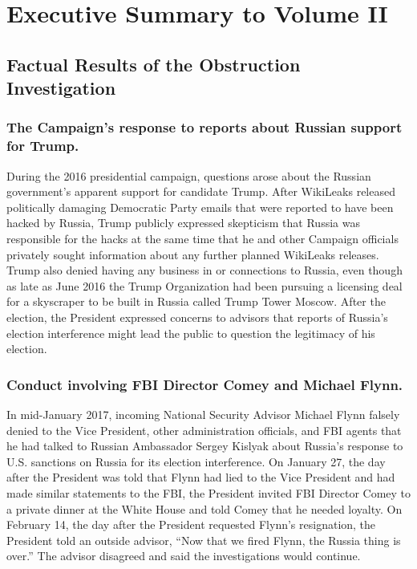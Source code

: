 \section*{Executive Summary to Volume II}
\label{sec:executive-2}

\subsection*{Factual Results of the Obstruction Investigation}

\subsubsection*{The Campaign’s response to reports about Russian support for Trump.}

During the 2016 presidential campaign, questions arose about the Russian government’s apparent support for candidate Trump.
After WikiLeaks released politically damaging Democratic Party emails that were reported to have been hacked by Russia, Trump publicly expressed skepticism that Russia was responsible for the hacks at the same time that he and other Campaign officials privately sought information about any further planned WikiLeaks releases.
Trump also denied having any business in or connections to Russia, even though as late as June 2016 the Trump Organization had been pursuing a licensing deal for a skyscraper to be built in Russia called Trump Tower Moscow.
After the election, the President expressed concerns to advisors that reports of Russia’s election interference might lead the public to question the legitimacy of his election.

\subsubsection*{Conduct involving FBI Director Comey and Michael Flynn.}

In mid-January 2017, incoming National Security Advisor Michael Flynn falsely denied to the Vice President, other administration officials, and FBI agents that he had talked to Russian Ambassador Sergey Kislyak about Russia’s response to U.S. sanctions on Russia for its election interference.
On January 27, the day after the President was told that Flynn had lied to the Vice President and had made similar statements to the FBI, the President invited FBI Director Comey to a private dinner at the White House and told Comey that he needed loyalty.
On February 14, the day after the President requested Flynn’s resignation, the President told an outside advisor, “Now that we fired Flynn, the Russia thing is over.”
The advisor disagreed and said the investigations would continue.

